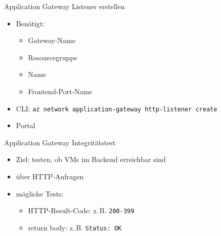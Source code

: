 \begin{flashcard}[Definition]{Application Gateway Listener erstellen}
    \begin{itemize}
        \item Benötigt:
            \begin{itemize}
                \item Gateway-Name
                \item Resourcegruppe
                \item Name
                \item Frontend-Port-Name
            \end{itemize}
        \item CLI: \texttt{az network application-gateway http-listener create}
        \item Portal
    \end{itemize}
\end{flashcard}

\begin{flashcard}[Definition]{Application Gateway Integritätstest}
    \begin{itemize}
        \item Ziel: testen, ob VMs im Backend erreichbar sind
        \item über HTTP-Anfragen
        \item mögliche Tests:
            \begin{itemize}
                \item HTTP-Result-Code:\newline
                    z.\,B. \texttt{200-399}
                \item return body:\newline
                    z.\,B. \texttt{Status: OK}
            \end{itemize}
    \end{itemize}
\end{flashcard}

